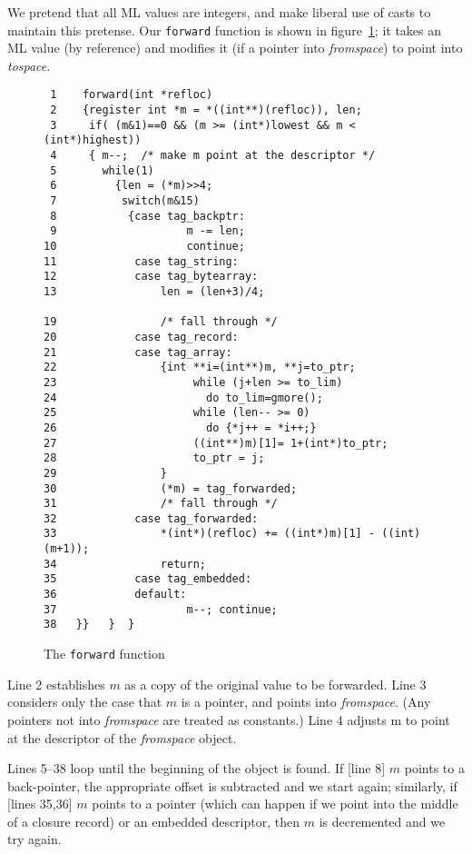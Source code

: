 We pretend that all ML values are integers, and make liberal use of
casts to maintain this pretense.  Our \verb"forward" function is
shown in figure~\ref{forward}; it
takes an ML value (by reference) and modifies it (if a pointer into
{\em fromspace}) to point into {\em tospace}.
\begin{figure}[htbp]
\label{forward}
\begin{verbatim}
 1    forward(int *refloc)
 2    {register int *m = *((int**)(refloc)), len;
 3     if( (m&1)==0 && (m >= (int*)lowest && m < (int*)highest))
 4     { m--;  /* make m point at the descriptor */
 5       while(1)
 6         {len = (*m)>>4;
 7          switch(m&15)
 8           {case tag_backptr:
 9                    m -= len;
10                    continue;
11            case tag_string:
12            case tag_bytearray:
13                len = (len+3)/4;

19                /* fall through */
20            case tag_record:
21            case tag_array:
22                {int **i=(int**)m, **j=to_ptr;
23                     while (j+len >= to_lim)
24                       do to_lim=gmore();
25                     while (len-- >= 0)          
26                       do {*j++ = *i++;}
27                     ((int**)m)[1]= 1+(int*)to_ptr;
28                     to_ptr = j;
29                }
30                (*m) = tag_forwarded;
31                /* fall through */
32            case tag_forwarded:
33                *(int*)(refloc) += ((int*)m)[1] - ((int)(m+1));
34                return;
35            case tag_embedded:
36            default:
37                    m--; continue;
38   }}   }  }
\end{verbatim}
\caption{The {\tt forward} function}
\end{figure}
Line 2 establishes $m$ as a copy of the original value to be forwarded.
Line 3 considers only the case that $m$ is a pointer, and points into
{\em fromspace}.  (Any pointers not into {\em fromspace} are treated as constants.)
Line 4 adjusts m to point at the descriptor of the {\em fromspace} object.

Lines 5--38 loop until the beginning of the object is found.
If [line 8] $m$ points to a back-pointer,
the appropriate offset is subtracted
and we start again; similarly, if [lines 35,36] $m$ points to a pointer
(which can happen if we
point into the middle of a closure record) or an 
embedded descriptor,
then $m$ is decremented and we try again.


